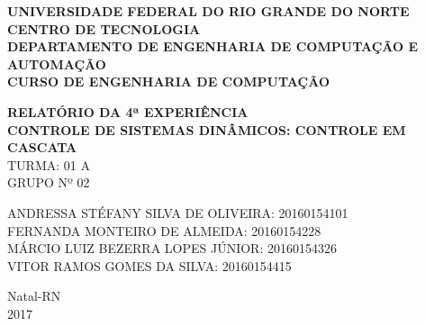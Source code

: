 \documentclass[a4paper,12pt]{article}
\begin{document}
\onehalfspacing

\thispagestyle{empty}

\setcounter{page}{1}


\begin{figure}[!ht]

\centering

\hspace{11.09cm}

\label{Logos}

\end{figure}


\vspace{-1cm}

\begin{center}
{\bf{\normalsize UNIVERSIDADE FEDERAL DO RIO GRANDE DO NORTE\\
CENTRO DE TECNOLOGIA\\
DEPARTAMENTO DE ENGENHARIA DE COMPUTAÇÃO E AUTOMAÇÃO\\
CURSO DE ENGENHARIA DE COMPUTAÇÃO
}}


\vspace{3.6cm}

{\bf{\large RELATÓRIO DA 4ª EXPERIÊNCIA\\
CONTROLE DE SISTEMAS DINÂMICOS: CONTROLE EM CASCATA\\
}}
\vspace{1.5cm}
{\large TURMA: 01 A\\
	GRUPO Nº 02}


\vspace{3.6cm}


\begin{flushright}
\begin{normalsize}
ANDRESSA STÉFANY SILVA DE OLIVEIRA: 20160154101\\
\vspace{0.8cm}
FERNANDA MONTEIRO DE ALMEIDA: 20160154228\\
\vspace{0.8cm}
MÁRCIO LUIZ BEZERRA LOPES JÚNIOR: 20160154326\\
\vspace{0.8cm}
VITOR RAMOS GOMES DA SILVA: 20160154415\\
\end{normalsize}
\end{flushright}


\vspace{2.5cm}

{\large Natal-RN\\
2017}

\end{center}
\end{document}
